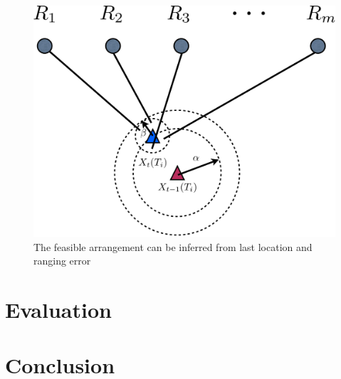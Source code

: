 \documentclass[conference]{IEEEtran}
\begin{document}
\begin{figure}[htpb]
    \begin{center}
	\includegraphics[width=.4\textwidth]{LimitToArrange}
    \end{center}
    \caption{The feasible arrangement can be inferred from last location and ranging
    error }
    \label{fig:LimitToArrange}
\end{figure}

\section{Evaluation}

\section{Conclusion}
%


\end{document}
